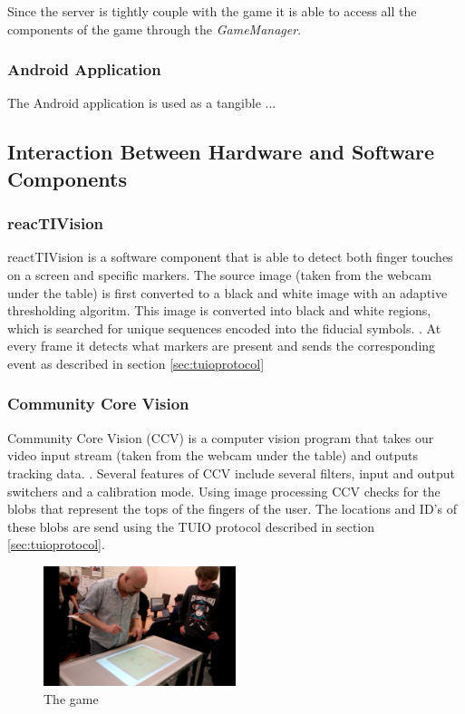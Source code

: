 \documentclass[a4paper,10pt]{article}
\begin{document}
Since the server is tightly couple with the game it is able to access all the components of the game through the \emph{GameManager}.

\subsubsection{Android Application}
The Android application is used as a tangible ...



\subsection{Interaction Between Hardware and Software Components}


\subsubsection{reacTIVision}
\label{sec:reactivision}
reactTIVision is a software component that is able to detect both finger touches on a screen and specific markers. 
The source image (taken from the webcam under the table) is first converted to a black and white image with an adaptive thresholding algoritm. 
This image is converted into black and white regions, which is searched for unique sequences encoded into the fiducial symbols. \cite{reactivision}.
At every frame it detects what markers are present and sends the corresponding event as described in section \ref{sec:tuioprotocol}

\subsubsection{Community Core Vision}
\label{sec:communitycorevision}	
		Community Core Vision (CCV) is a computer vision program that takes our video input stream (taken from the webcam under the table) and outputs tracking data. \cite{ccv}.
	    	Several features of CCV include several filters, input and output switchers and a calibration mode. 
		Using image processing CCV checks for the blobs that represent the tops of the fingers of the user. 
		The locations and ID's of these blobs are send using the TUIO protocol described in section \ref{sec:tuioprotocol}.
		\begin{figure}[h!]
		  \caption{The game}
		  \centering
		  \includegraphics[width=0.5\textwidth]{images/tafelgebruik}
		\end{figure}
		
\end{document}
